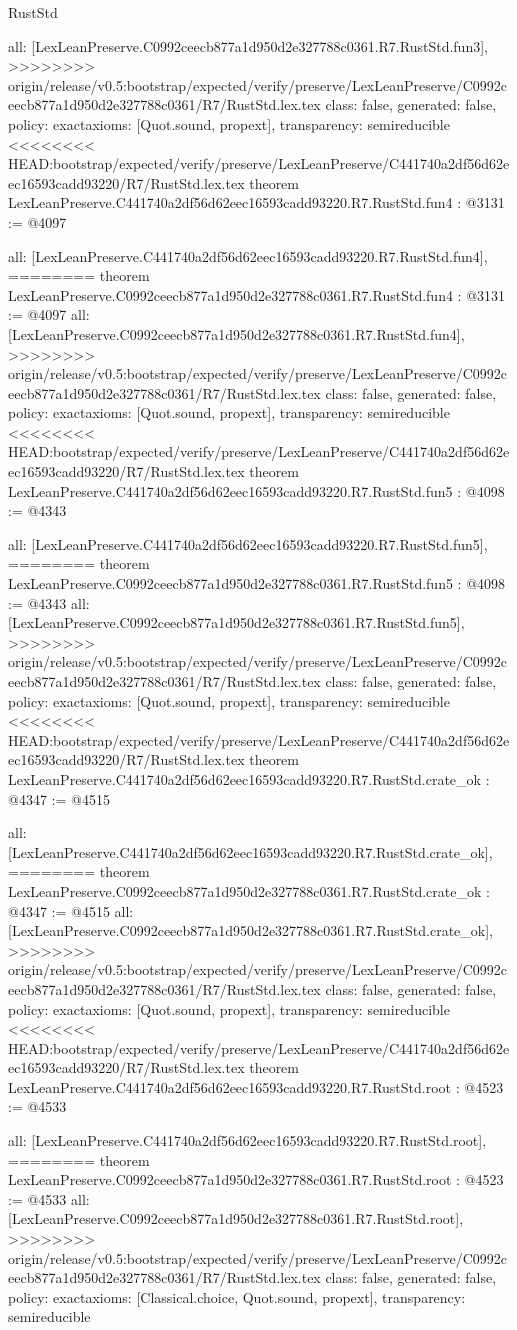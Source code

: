 \begin{lexlean}{RustStd}
\begin{coremodule}
{\begin{coremodule}
{{{{{{{  all: [LexLeanPreserve.C0992ceecb877a1d950d2e327788c0361.R7.RustStd.fun3],
>>>>>>>> origin/release/v0.5:bootstrap/expected/verify/preserve/LexLeanPreserve/C0992ceecb877a1d950d2e327788c0361/R7/RustStd.lex.tex
  class: false,
  generated: false,
  policy: exact{axioms: [Quot.sound, propext]},
  transparency: semireducible
}
<<<<<<<< HEAD:bootstrap/expected/verify/preserve/LexLeanPreserve/C441740a2df56d62eec16593cadd93220/R7/RustStd.lex.tex
theorem LexLeanPreserve.C441740a2df56d62eec16593cadd93220.R7.RustStd.fun4 : @3131 := @4097 {
  all: [LexLeanPreserve.C441740a2df56d62eec16593cadd93220.R7.RustStd.fun4],
========
theorem LexLeanPreserve.C0992ceecb877a1d950d2e327788c0361.R7.RustStd.fun4 : @3131 := @4097 {
  all: [LexLeanPreserve.C0992ceecb877a1d950d2e327788c0361.R7.RustStd.fun4],
>>>>>>>> origin/release/v0.5:bootstrap/expected/verify/preserve/LexLeanPreserve/C0992ceecb877a1d950d2e327788c0361/R7/RustStd.lex.tex
  class: false,
  generated: false,
  policy: exact{axioms: [Quot.sound, propext]},
  transparency: semireducible
}
<<<<<<<< HEAD:bootstrap/expected/verify/preserve/LexLeanPreserve/C441740a2df56d62eec16593cadd93220/R7/RustStd.lex.tex
theorem LexLeanPreserve.C441740a2df56d62eec16593cadd93220.R7.RustStd.fun5 : @4098 := @4343 {
  all: [LexLeanPreserve.C441740a2df56d62eec16593cadd93220.R7.RustStd.fun5],
========
theorem LexLeanPreserve.C0992ceecb877a1d950d2e327788c0361.R7.RustStd.fun5 : @4098 := @4343 {
  all: [LexLeanPreserve.C0992ceecb877a1d950d2e327788c0361.R7.RustStd.fun5],
>>>>>>>> origin/release/v0.5:bootstrap/expected/verify/preserve/LexLeanPreserve/C0992ceecb877a1d950d2e327788c0361/R7/RustStd.lex.tex
  class: false,
  generated: false,
  policy: exact{axioms: [Quot.sound, propext]},
  transparency: semireducible
}
<<<<<<<< HEAD:bootstrap/expected/verify/preserve/LexLeanPreserve/C441740a2df56d62eec16593cadd93220/R7/RustStd.lex.tex
theorem LexLeanPreserve.C441740a2df56d62eec16593cadd93220.R7.RustStd.crate_ok : @4347 := @4515 {
  all: [LexLeanPreserve.C441740a2df56d62eec16593cadd93220.R7.RustStd.crate_ok],
========
theorem LexLeanPreserve.C0992ceecb877a1d950d2e327788c0361.R7.RustStd.crate_ok : @4347 := @4515 {
  all: [LexLeanPreserve.C0992ceecb877a1d950d2e327788c0361.R7.RustStd.crate_ok],
>>>>>>>> origin/release/v0.5:bootstrap/expected/verify/preserve/LexLeanPreserve/C0992ceecb877a1d950d2e327788c0361/R7/RustStd.lex.tex
  class: false,
  generated: false,
  policy: exact{axioms: [Quot.sound, propext]},
  transparency: semireducible
}
<<<<<<<< HEAD:bootstrap/expected/verify/preserve/LexLeanPreserve/C441740a2df56d62eec16593cadd93220/R7/RustStd.lex.tex
theorem LexLeanPreserve.C441740a2df56d62eec16593cadd93220.R7.RustStd.root : @4523 := @4533 {
  all: [LexLeanPreserve.C441740a2df56d62eec16593cadd93220.R7.RustStd.root],
========
theorem LexLeanPreserve.C0992ceecb877a1d950d2e327788c0361.R7.RustStd.root : @4523 := @4533 {
  all: [LexLeanPreserve.C0992ceecb877a1d950d2e327788c0361.R7.RustStd.root],
>>>>>>>> origin/release/v0.5:bootstrap/expected/verify/preserve/LexLeanPreserve/C0992ceecb877a1d950d2e327788c0361/R7/RustStd.lex.tex
  class: false,
  generated: false,
  policy: exact{axioms: [Classical.choice, Quot.sound, propext]},
  transparency: semireducible
}

}}}}}}}}}}
\end{coremodule}}
\end{coremodule}
\end{lexlean}
